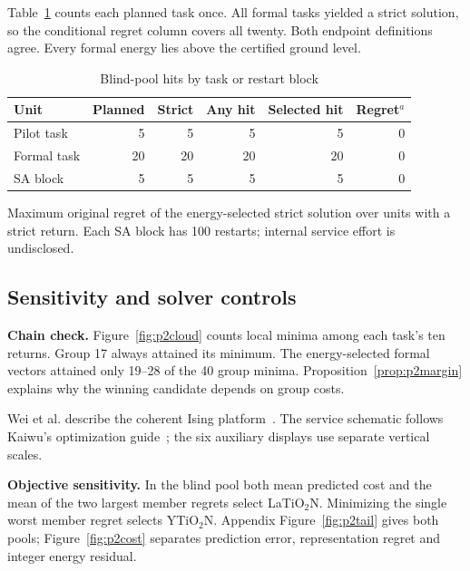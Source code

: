 Table~\ref{tab:p2service} counts each planned task once. All formal tasks yielded a strict solution, so the conditional regret column covers all twenty. Both endpoint definitions agree. Every formal energy lies above the certified ground level.
\begin{table}[!htb]
\centering
\caption{Blind-pool hits by task or restart block}\label{tab:p2service}
\begin{threeparttable}
\begin{tabular}{@{}lrrrrr@{}}
\toprule
Unit & Planned & Strict & Any hit & Selected hit & Regret$^{a}$\\
\midrule
Pilot task & 5 & 5 & 5 & 5 & 0\\
Formal task & 20 & 20 & 20 & 20 & 0\\
SA block & 5 & 5 & 5 & 5 & 0\\
\bottomrule
\end{tabular}
\begin{tablenotes}[flushleft]\footnotesize
\item[$a$] Maximum original regret of the energy-selected strict solution over units with a strict return. Each SA block has 100 restarts; internal service effort is undisclosed.
\end{tablenotes}
\end{threeparttable}
\end{table}
\FloatBarrier

\subsection{Sensitivity and solver controls}\label{sec:p2checks}
\textbf{Chain check.} Figure~\ref{fig:p2cloud} counts local minima among each task's ten returns. Group 17 always attained its minimum. The energy-selected formal vectors attained only 19--28 of the 40 group minima. Proposition~\ref{prop:p2margin} explains why the winning candidate depends on group costs.

Wei et al. describe the coherent Ising platform~\cite{wei2026}. The service schematic follows Kaiwu's optimization guide~\cite{kaiwu144}; the six auxiliary displays use separate vertical scales.

\textbf{Objective sensitivity.} In the blind pool both mean predicted cost and the mean of the two largest member regrets select LaTiO$_2$N. Minimizing the single worst member regret selects YTiO$_2$N. Appendix Figure~\ref{fig:p2tail} gives both pools; Figure~\ref{fig:p2cost} separates prediction error, representation regret and integer energy residual.

